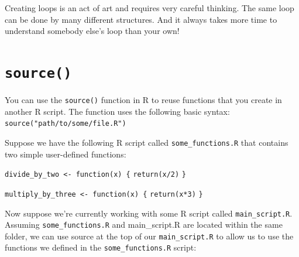 \documentclass[
]{book}
\newenvironment{Shaded}{\begin{snugshade}}{\end{snugshade}}
\newcommand{\AttributeTok}[1]{\textcolor[rgb]{0.77,0.63,0.00}{#1}}
\newcommand{\DecValTok}[1]{\textcolor[rgb]{0.00,0.00,0.81}{#1}}
\newcommand{\FunctionTok}[1]{\textcolor[rgb]{0.00,0.00,0.00}{#1}}
\newcommand{\NormalTok}[1]{#1}
\newcommand{\OtherTok}[1]{\textcolor[rgb]{0.56,0.35,0.01}{#1}}
\newcommand{\SpecialCharTok}[1]{\textcolor[rgb]{0.00,0.00,0.00}{#1}}
\newcommand{\StringTok}[1]{\textcolor[rgb]{0.31,0.60,0.02}{#1}}
\theoremstyle{definition}
\theoremstyle{definition}
\theoremstyle{definition}
\theoremstyle{definition}
\theoremstyle{remark}
\begin{document}
Creating loops is an act of art and requires very careful thinking. The same loop can be done by many different structures. And it always takes more time to understand somebody else's loop than your own!

\hypertarget{source}{%
\section{\texorpdfstring{\texttt{source()}}{source()}}\label{source}}

You can use the \texttt{source()} function in R to reuse functions that you create in another R script. The function uses the following basic syntax: \texttt{source("path/to/some/file.R")}

Suppose we have the following R script called \texttt{some\_functions.R} that contains two simple user-defined functions:

\texttt{divide\_by\_two\ \textless{}-\ function(x)\ \{}
\texttt{return(x/2)}
\texttt{\}}

\texttt{multiply\_by\_three\ \textless{}-\ function(x)\ \{}
\texttt{return(x*3)}
\texttt{\}}

Now suppose we're currently working with some R script called \texttt{main\_script.R}. Assuming \texttt{some\_functions.R} and main\_script.R are located within the same folder, we can use source at the top of our \texttt{main\_script.R} to allow us to use the functions we defined in the \texttt{some\_functions.R} script:

\begin{Shaded}
\end{Shaded}
\end{document}
